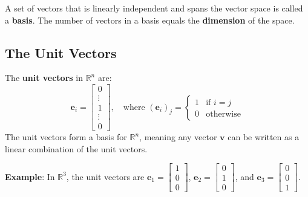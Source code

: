 A set of vectors that is linearly independent and spans the vector space is called a \textbf{basis}. The number of vectors in a basis equals the \textbf{dimension} of the space.


\subsection{The Unit Vectors}
The \textbf{unit vectors} in $ \mathbb{R}^n $ are:
\begin{equation*}
    \mathbf{e}_i = \begin{bmatrix}0 \\ \vdots \\ 1 \\ \vdots \\ 0\end{bmatrix}, \quad \text{where } (\mathbf{e}_{i})_j = \begin{cases} 1 & \text{if } i = j \\ 0 & \text{otherwise} \end{cases}
\end{equation*}
The unit vectors form a basis for $ \mathbb{R}^n $, meaning any vector $ \mathbf{v} $ can be written as a linear combination of the unit vectors.
\begin{exampleBox}
    \textbf{Example}: In $ \mathbb{R}^3 $, the unit vectors are $ \mathbf{e}_1 = \begin{bmatrix}1 \\ 0 \\ 0\end{bmatrix} $, $ \mathbf{e}_2 = \begin{bmatrix}0 \\ 1 \\ 0\end{bmatrix} $, and $ \mathbf{e}_3 = \begin{bmatrix}0 \\ 0 \\ 1\end{bmatrix} $.
\end{exampleBox}

